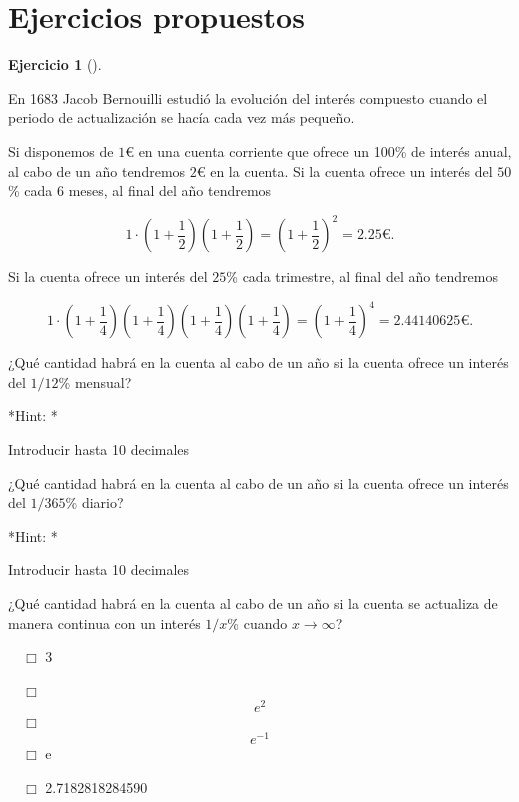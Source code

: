 \documentclass[
  a4paper,
]{scrreport}
\theoremstyle{definition}
\newtheorem{exercise}{Ejercicio}[chapter]
\theoremstyle{remark}
\begin{document}
\hypertarget{ejercicios-propuestos-2}{%
\section{Ejercicios propuestos}\label{ejercicios-propuestos-2}}

\begin{exercise}[]\protect\hypertarget{exr-interes-compuesto}{}\label{exr-interes-compuesto}

En 1683 Jacob Bernouilli estudió la evolución del interés compuesto
cuando el periodo de actualización se hacía cada vez más pequeño.

Si disponemos de \(1\)€ en una cuenta corriente que ofrece un 100\% de
interés anual, al cabo de un año tendremos \(2\)€ en la cuenta. Si la
cuenta ofrece un interés del \(50\)\% cada 6 meses, al final del año
tendremos

\[
1\cdot\left(1+\frac{1}{2}\right)\left(1+\frac{1}{2}\right)= \left(1+\frac{1}{2}\right)^2 = 2.25\mbox{€}.
\]

Si la cuenta ofrece un interés del \(25\)\% cada trimestre, al final del
año tendremos

\[
1\cdot\left(1+\frac{1}{4}\right)\left(1+\frac{1}{4}\right)\left(1+\frac{1}{4}\right)\left(1+\frac{1}{4}\right)= \left(1+\frac{1}{4}\right)^4 = 2.44140625\mbox{€}.
\]

¿Qué cantidad habrá en la cuenta al cabo de un año si la cuenta ofrece
un interés del \(1/12\)\% mensual?

\vspace{18pt}*Hint: *

Introducir hasta 10 decimales

¿Qué cantidad habrá en la cuenta al cabo de un año si la cuenta ofrece
un interés del \(1/365\)\% diario?

\vspace{18pt}*Hint: *

Introducir hasta 10 decimales

¿Qué cantidad habrá en la cuenta al cabo de un año si la cuenta se
actualiza de manera continua con un interés \(1/x\)\% cuando
\(x\to\infty\)?

${\quad\Box}$ 3

${\quad\Box}$ $$e^2$$
${\quad\Box}$ $$e^{-1}$$
${\quad\Box}$ e

${\quad\Box}$ 2.7182818284590

\end{exercise}
\end{document}
